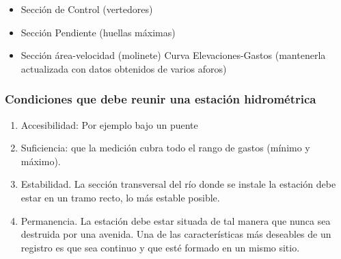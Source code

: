 \begin{itemize}
    \item Sección de Control (vertedores)
    \item Sección Pendiente (huellas máximas)
    \item Sección área-velocidad (molinete) Curva Elevaciones-Gastos (mantenerla actualizada con datos obtenidos de varios aforos)
\end{itemize}
\subsubsection{Condiciones que debe reunir una estación hidrométrica}
\begin{enumerate}
    \item Accesibilidad: Por ejemplo bajo un puente
    \item Suficiencia: que la medición cubra todo el rango de gastos (mínimo y máximo).
    \item Estabilidad. La sección transversal del río donde se instale la estación debe estar en un tramo recto, lo más estable posible.
    \item Permanencia. La estación debe estar situada de tal manera que nunca sea destruida por una avenida. Una de las características más deseables de un registro es que sea continuo y que esté formado en un mismo sitio.
\end{enumerate}
